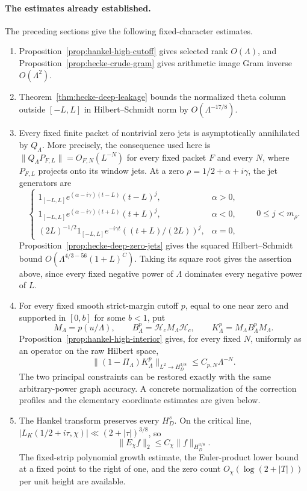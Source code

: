 \paragraph{The estimates already established.}
The preceding sections give the following fixed-character estimates.
\begin{enumerate}
\item Proposition~\ref{prop:hankel-high-cutoff} gives selected rank
$O(\Lambda)$, and Proposition~\ref{prop:hecke-crude-gram} gives
arithmetic image Gram inverse $O(\Lambda^2)$.
\item Theorem~\ref{thm:hecke-deep-leakage} bounds the normalized theta
column outside $[-L,L]$ in Hilbert--Schmidt norm by $O(\Lambda^{-17/8})$.
\item Every fixed finite packet of nontrivial zero jets is asymptotically
annihilated by $Q_\Lambda$. More precisely, the consequence used here is
$\|Q_\Lambda P_{F,L}\|=O_{F,N}(L^{-N})$ for every fixed packet $F$
and every $N$, where $P_{F,L}$ projects onto its window jets. At a zero
$\rho=1/2+\alpha+i\gamma$, the jet generators are
\[
 \begin{cases}
 1_{[-L,L]}e^{(\alpha-i\gamma)(t-L)}(t-L)^j,&\alpha>0,\\
 1_{[-L,L]}e^{(\alpha-i\gamma)(t+L)}(t+L)^j,&\alpha<0,\\
 (2L)^{-1/2}1_{[-L,L]}e^{-i\gamma t}
                  ((t+L)/(2L))^j,&\alpha=0,
 \end{cases}
 \qquad 0\le j<m_\rho.
\]
Proposition~\ref{prop:hecke-deep-zero-jets} gives the squared
Hilbert--Schmidt bound $O(\Lambda^{4/3-56}(1+L)^C)$. Taking its
square root gives the assertion above, since every fixed negative
power of $\Lambda$ dominates every negative power of $L$.
\item For every fixed smooth strict-margin cutoff $p$, equal to one near
zero and supported in $[0,b]$ for some $b<1$, put
\[
 M_\Lambda=p(u/\Lambda),\qquad
 B_\Lambda^p=\mathcal H_cM_\Lambda\mathcal H_c,
 \qquad K_\Lambda^p=M_\Lambda B_\Lambda^pM_\Lambda.
\]
Proposition~\ref{prop:hankel-high-interior} gives, for every fixed
$N$, uniformly as an operator on the raw Hilbert space,
\begin{equation}\label{eq:hi-strict-margin-input}
 \|(1-\Pi_\Lambda)K_\Lambda^p\|_{L^2\to H_D^{3/8}}
                                      \le C_{p,N}\Lambda^{-N}.
\end{equation}
The two principal constraints can be restored exactly with the same
arbitrary-power graph accuracy. A concrete normalization of the correction
profiles and the elementary coordinate estimates are given below.
\item The Hankel transform preserves every $H_D^s$. On the critical line,
$|L_K(1/2+i\tau,\chi)|\ll(2+|\tau|)^{3/8}$, so
\begin{equation}\label{eq:hi-theta-graph}
       \|E_\chi f\|_2\le C_\chi\|f\|_{H_D^{3/8}}.
\end{equation}
The fixed-strip polynomial growth estimate, the Euler-product lower bound
at a fixed point to the right of one, and the zero count
$O_\chi(\log(2+|T|))$ per unit height are available.
\end{enumerate}
